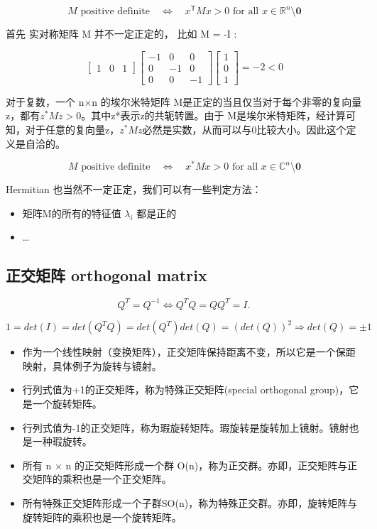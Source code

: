\documentclass[
]{book}
\providecommand{\tightlist}{%
  \setlength{\itemsep}{0pt}\setlength{\parskip}{0pt}}
\begin{document}
\[
{\displaystyle M{\text{ positive definite}}\quad \iff \quad x^{\textsf {T}}Mx>0{\text{ for all }}x\in \mathbb {R} ^{n}\setminus \mathbf {0} }
\]

首先 实对称矩阵 M 并不一定正定的， 比如 M = -I :

\[
\begin{bmatrix}1 & 0 & 1\end{bmatrix}\begin{bmatrix}-1 & 0 & 0 \\ 0 & -1 & 0 \\ 0 & 0 & -1 \end{bmatrix}\begin{bmatrix}1 \\ 0 \\ 1\end{bmatrix} = -2 < 0
\]

对于复数，一个 n×n 的埃尔米特矩阵 M是正定的当且仅当对于每个非零的复向量z，都有\(z^*Mz > 0\)。其中z*表示z的共轭转置。由于 M是埃尔米特矩阵，经计算可知，对于任意的复向量z，\(z^*Mz\)必然是实数，从而可以与0比较大小。因此这个定义是自洽的。

\[{\displaystyle M{\text{ positive definite}}\quad \iff \quad x^{*}Mx>0{\text{ for all }}x\in \mathbb {C} ^{n}\setminus \mathbf {0} }
\]

Hermitian 也当然不一定正定，我们可以有一些判定方法：

\begin{itemize}
\tightlist
\item
  矩阵M的所有的特征值 \(\lambda_i\) 都是正的
\item
  \ldots{}
\end{itemize}

\hypertarget{ux6b63ux4ea4ux77e9ux9635-orthogonal-matrix}{%
\subsection{正交矩阵 orthogonal matrix}\label{ux6b63ux4ea4ux77e9ux9635-orthogonal-matrix}}

\[Q^{T}=Q^{-1}\Leftrightarrow Q^{T}Q=QQ^{T}=I.\,\!\]

\[{\displaystyle 1=det(I)=det(Q^{T}Q)=det(Q^{T})det(Q)=(det(Q))^{2}\Rightarrow det(Q)=\pm 1}\]

\begin{itemize}
\tightlist
\item
  作为一个线性映射（变换矩阵），正交矩阵保持距离不变，所以它是一个保距映射，具体例子为旋转与镜射。
\item
  行列式值为+1的正交矩阵，称为特殊正交矩阵(special orthogonal group)，它是一个旋转矩阵。
\item
  行列式值为-1的正交矩阵，称为瑕旋转矩阵。瑕旋转是旋转加上镜射。镜射也是一种瑕旋转。
\item
  所有 n × n 的正交矩阵形成一个群 O(n)，称为正交群。亦即，正交矩阵与正交矩阵的乘积也是一个正交矩阵。
\item
  所有特殊正交矩阵形成一个子群SO(n)，称为特殊正交群。亦即，旋转矩阵与旋转矩阵的乘积也是一个旋转矩阵。
\end{itemize}
\end{document}
